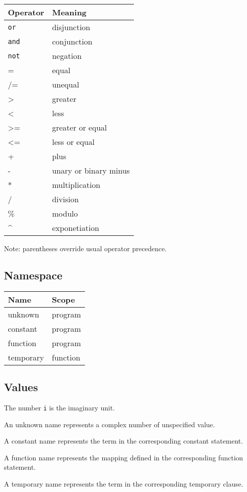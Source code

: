 \documentclass[letterpaper, 12pt]{extarticle}
\theoremstyle{definition} %
\newcommand{\code}[1]{\texttt{#1}}
\begin{document}
\begin{tabular}{l|l}
Operator & Meaning \\ \toprule
\code{or} & disjunction \\
\code{and} & conjunction \\
\code{not} & negation \\
= & equal \\
/= & unequal \\
\textgreater & greater \\
\textless & less \\
\textgreater= & greater or equal \\
\textless= & less or equal \\
+ & plus \\
- & unary or binary minus \\
* & multiplication \\
/ & division \\
\% & modulo \\
\^{} & exponetiation
\end{tabular}

Note: parentheses override usual operator precedence.

\subsection{Namespace}

\begin{tabular}{l|l}
Name & Scope \\ \toprule
unknown & program \\
constant & program \\
function & program \\
temporary & function
\end{tabular}

\subsection{Values}

The number \code{i} is the imaginary unit.

An unknown name represents a complex number
of unspecified value.

A constant name represents the term
in the corresponding constant statement.

A function name represents the mapping
defined in the corresponding function statement.

A temporary name represents the term
in the corresponding temporary clause.
\end{document}
